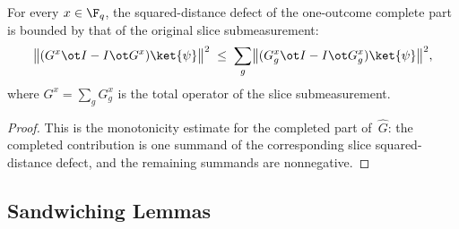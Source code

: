 \begin{lemma}\label{lem:q-sdd-complete-part-slice-bound}
	\leanok
	For every $x \in \F_q$, the squared-distance defect of the one-outcome
	complete part is bounded by that of the original slice submeasurement:
	\[
		\bigl\|
		(G^x \ot I - I \ot G^x)\ket{\psi}
		\bigr\|^2
		\;\le\;
		\sum_g
		\bigl\|
		(G^x_g \ot I - I \ot G^x_g)\ket{\psi}
		\bigr\|^2,
	\]
	where $G^x = \sum_g G^x_g$ is the total operator of the slice
	submeasurement.
\end{lemma}
\begin{proof}
	\leanok
	This is the monotonicity estimate for the completed part of~$\widehat G$:
	the completed contribution is one summand of the corresponding slice
	squared-distance defect, and the remaining summands are nonnegative.
\end{proof}

\subsection{Sandwiching Lemmas}
\label{sec:ld-sandwiching}

